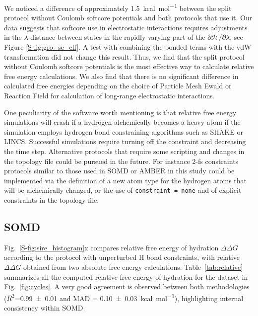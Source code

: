 \documentclass[journal=jctcce,manuscript=article]{achemso}
\newcommand{\inpopt}[1]{\texttt{#1}}
\begin{document}
We noticed a difference of approximately \SI{1.5}{kcal.mol^{-1}} between the 
split protocol without Coulomb softcore potentials and both protocols that 
use it. Our data suggests that softcore use in electrostatic interactions requires 
adjustments in the $\lambda$-distance between states in the
rapidly varying part of the $\partial \mathcal{H}/\partial\lambda$, see Figure
\ref{S-fig:gro_sc_eff}. A test with combining the bonded terms with the vdW 
transformation did not change this result.  Thus, we find that the split protocol 
without Coulomb softcore potentials is the most effective way to calculate 
relative free energy calculations.  We also find that there is no significant 
difference in calculated free energies depending on the choice of Particle 
Mesh Ewald or Reaction Field for calculation of long-range electrostatic interactions.

One peculiarity of the software worth mentioning is that relative free energy 
simulations will crash if a hydrogen alchemically becomes a heavy atom if the 
simulation employs hydrogen bond constraining algorithms such as SHAKE or LINCS.
Successful simulations require turning off the constraint and decreasing 
the time step. Alternative protocols that require some scripting and 
changes in the topology file could be pursued in the future. For instance 2-fs 
constraints protocols similar to those used in SOMD or AMBER in this study 
could be implemented via the definition of a new atom type for the hydrogen 
atoms that will be alchemically changed, or the use of \inpopt{constraint = 
none} and of explicit constraints in the topology file.

\subsection{SOMD}
\label{sec:somd-results}

Fig.~\ref{S-fig:sire_histogram}x compares relative free energy of hydration 
$\Delta\Delta G$ according to the protocol with unperturbed H bond constraints, with relative 
$\Delta \Delta G$ obtained from two absolute free energy calculations. 
Table~\ref{tab:relative} summarizes all the computed relative free energy of 
hydration for the dataset in Fig.~\ref{fig:cycles}.
A very good agreement is observed between both methodologies 
($R^2$=\SI{0.99+-0.01}{} and MAD = \SI{0.10+-0.03}{kcal.mol^{-1}}), 
highlighting internal consistency within SOMD.
\end{document}
